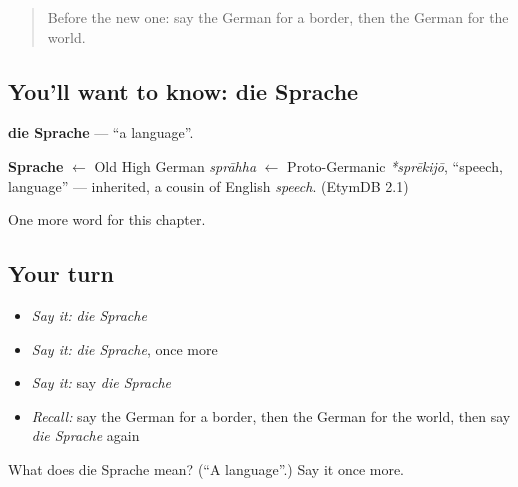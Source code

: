 \label{lesson:GE-C100-sprache}



\begin{quote}
Before the new one: say the German for a border, then the German for the world.
\end{quote}

\subsection*{You'll want to know: die Sprache}
\textbf{die Sprache} — \textquotedblleft{}a language\textquotedblright{}.

\begin{cousinweb}
\textbf{Sprache} $\leftarrow$ Old High German \emph{sprāhha} $\leftarrow$ Proto-Germanic \emph{*sprēkijō}, \textquotedblleft{}speech, language\textquotedblright{} — inherited, a cousin of English \emph{speech}. (EtymDB 2.1)
\end{cousinweb}

\begin{grammarlens}[title={What you've built}]
One more word for this chapter.
\end{grammarlens}

\subsection*{Your turn}
\begin{itemize}
\raggedright
  \item \emph{Say it:} \emph{die Sprache}
  \item \emph{Say it:} \emph{die Sprache}, once more
  \item \emph{Say it:} say \emph{die Sprache}
  \item \emph{Recall:} say the German for a border, then the German for the world, then say \emph{die Sprache} again
\end{itemize}

\begin{tcolorbox}[breakable,colback=teal!4,colframe=teal!35!black,title={Before you move on}]
What does die Sprache mean? (\textquotedblleft{}A language\textquotedblright{}.) Say it once more.
\end{tcolorbox}
